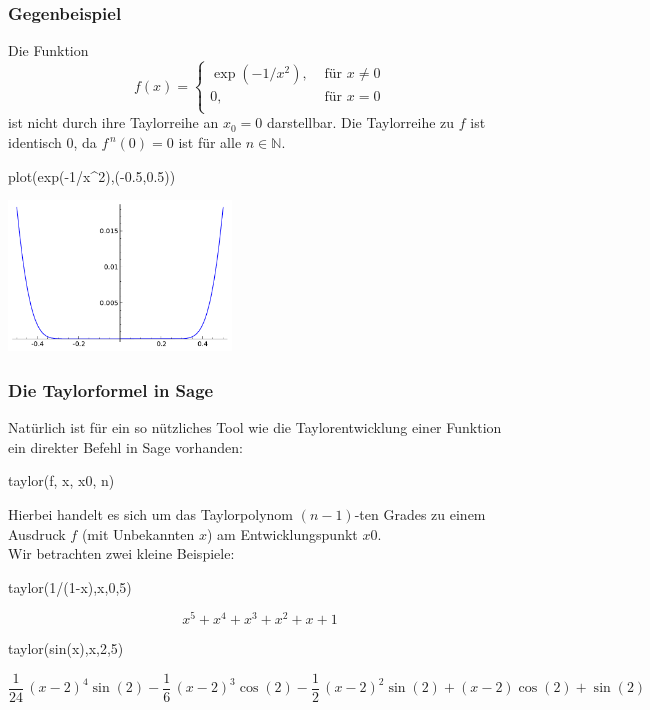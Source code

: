 \documentclass[fontsize=12pt,paper=a4,twoside,bibtotoc,idxtotoc,
liststotoc,pagesize,BCOR1.2cm,DIV15,chapterprefix,pagesize=pdftex]{scrbook}
\theoremstyle{plain}
\theoremstyle{definition}
\theoremstyle{remark}
\begin{document}
\subsubsection{Gegenbeispiel}
Die Funktion
\[ f(x) = \left \{ \begin{array}{ll}
\exp(-1/x^2), & \mbox{ für } x \neq 0\\
0, & \mbox{ für } x = 0\\
\end{array} \right. \]
ist nicht durch ihre Taylorreihe an $x_0=0$ darstellbar. Die Taylorreihe zu $f$
ist identisch $0$, da $f^{\,n}(0)=0$ ist für alle $n \in \mathbb{N}$. \\
\begin{sagein}
plot(exp(-1/x^2),(-0.5,0.5)) 
\end{sagein}
\begin{center}
  \includegraphics[height=4cm]{taylorgegen.pdf}
 \end{center}

\subsubsection{Die Taylorformel in Sage}
Natürlich ist für ein so nützliches Tool wie die Taylorentwicklung einer Funktion ein direkter Befehl in 
Sage vorhanden:
\begin{sagein}
taylor(f, x, x0, n)
\end{sagein}
Hierbei handelt es sich um das Taylorpolynom $(n-1)$-ten Grades zu einem Ausdruck $f$ 
(mit Unbekannten $x$) am Entwicklungspunkt $x0$. \\
Wir betrachten zwei kleine Beispiele:
\begin{sagein}
taylor(1/(1-x),x,0,5)
\end{sagein}
{\color{blue}\[ x^{5} + x^{4} + x^{3} + x^{2} + x + 1\]}
\begin{sagein}
taylor(sin(x),x,2,5)
\end{sagein}
{\small\color{blue}\[ \frac{1}{24} \, {\left(x - 2\right)}^{4} \sin\left(2\right) -
\frac{1}{6} \, {\left(x - 2\right)}^{3} \cos\left(2\right) - \frac{1}{2}
\, {\left(x - 2\right)}^{2} \sin\left(2\right) + {\left(x - 2\right)}
\cos\left(2\right) + \sin\left(2\right)\]}
\end{document}
